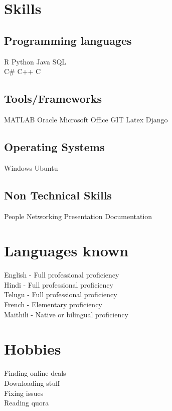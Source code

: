 \documentclass[]{deedy-resume-openfont}
\begin{document}
\begin{minipage}[t]{0.33\textwidth}

\section{Skills}
\subsection{Programming languages}
R \textbullet{}   Python \textbullet{} Java \textbullet{} SQL \\
C\# \textbullet{} C++ \textbullet{} C\\ 
\subsection{Tools/Frameworks}
MATLAB \textbullet{} Oracle \textbullet{} Microsoft Office \textbullet{} GIT \textbullet{} Latex \textbullet{} Django \\
\subsection{Operating Systems}
Windows \textbullet{} Ubuntu \\
\subsection{Non Technical Skills}
People \textbullet{} Networking \textbullet{} Presentation \textbullet{} Documentation \\
\sectionsep


\section{Languages known}
English - Full professional proficiency\\
Hindi - Full professional proficiency\\
Telugu - Full professional proficiency\\
French - Elementary proficiency\\
Maithili - Native or bilingual proficiency\\
\sectionsep


\section{Hobbies}
Finding online deals\\
Downloading stuff\\
Fixing issues\\
Reading quora\\
\sectionsep


\end{minipage}
\end{document}
